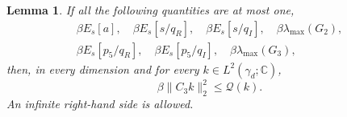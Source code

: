 \documentclass[11pt]{article}
\newtheorem{lemma}[theorem]{Lemma}
\theoremstyle{remark}\newtheorem{remark}[theorem]{Remark}
\newcommand{\C}{\mathbb C}
\newcommand{\norm}[1]{\lVert #1\rVert}
\begin{document}
\begin{lemma}\label{lem:weighted}
If all the following quantities are at most one,
\begin{equation}\label{eq:gramconditions}
\begin{gathered}
\beta E_s[a],\quad\beta E_s[s/q_R],\quad\beta E_s[s/q_I],
\quad\beta\lambda_{\max}(G_2),\\
\beta E_s[p_5/q_R],\quad\beta E_s[p_5/q_I],
\quad\beta\lambda_{\max}(G_3),
\end{gathered}
\end{equation}
then, in every dimension and for every \(k\in L^2(\gamma_d;\C)\),
\begin{equation}\label{eq:weighted}
\beta\norm{C_3k}_2^2\le\mathcal Q(k).
\end{equation}
An infinite right-hand side is allowed.
\end{lemma}
\end{document}
